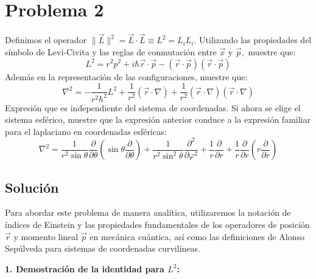 \documentclass[a4paper]{article}
\begin{document}
\section{Problema 2}

Definimos el operador $\| \vec{L} \|^2 = \vec{L} \cdot \vec{L} \equiv L^2 = L_i L_i.$ Utilizando las propiedades del símbolo de Levi-Civita y las reglas de conmutación entre $\vec{x}$ y $\vec{p},$ muestre que:
\begin{equation}
L^2 = r^2p^2 + i\hbar \vec{r} \cdot \vec{p} - (\vec{r} \cdot \vec{p}) (\vec{r} \cdot \vec{p})
\end{equation}
Además en la representación de las configuraciones, muestre que:
\begin{equation}
\nabla^2 = - \frac{1}{r^2\hbar^2}L^2 + \frac{1}{r^2} (\vec{r} \cdot \nabla) + \frac{1}{r^2} (\vec{r} \cdot \nabla) (\vec{r} \cdot \nabla)
\end{equation}
Expresión que es independiente del sistema de coordenadas. Si ahora se elige el sistema esférico, muestre que la expresión anterior conduce a la expresión familiar para el laplaciano en coordenadas esféricas:
\begin{equation}
\nabla^2 = \frac{1}{r^2 \sin \theta} \frac{\partial}{\partial \theta} \left( \sin \theta \frac{\partial}{\partial \theta} \right) + \frac{1}{r^2 \sin^2 \theta} \frac{\partial^2}{\partial \varphi^2} + \frac{1}{r} \frac{\partial}{\partial r} + \frac{1}{r} \frac{\partial}{\partial r} \left( r \frac{\partial}{\partial r} \right)
\end{equation}

\subsection{Solución}

Para abordar este problema de manera analítica, utilizaremos la notación de índices de Einstein y las propiedades fundamentales de los operadores de posición $\vec{r}$ y momento lineal $\vec{p}$ en mecánica cuántica, así como las definiciones de Alonso Sepúlveda para sistemas de coordenadas curvilíneas.

\textbf{1. Demostración de la identidad para $L^2$:}
\end{document}
